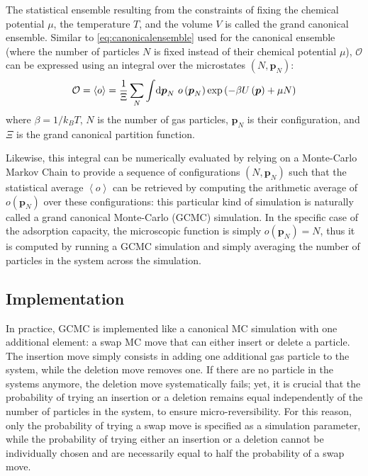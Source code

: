 \documentclass[main.tex]{subfiles}
\begin{document}
The statistical ensemble resulting from the constraints of fixing the chemical potential $\mu$, the temperature $T$, and the volume $V$ is called the grand canonical ensemble. Similar to \cref{eq:canonicalensemble} used for the canonical ensemble (where the number of particles $N$ is fixed instead of their chemical potential $\mu$), $\mathcal O$ can be expressed using an integral over the microstates $(N,\boldsymbol p_N)$:
\[\mathcal O = \left<o\right> = \frac1\Xi\sum_N\int\!\text d{\boldsymbol p_N}\  o\left({\boldsymbol p_N}\right)\exp\left(-\beta U\left({\boldsymbol p}\right) + \mu N\right)\label{eq:grandcanonicalensemble}\]
where $\beta = 1/k_BT$, $N$ is the number of gas particles, $\boldsymbol p_N$ is their configuration, and $\Xi$ is the grand canonical partition function.

Likewise, this integral can be numerically evaluated by relying on a Monte-Carlo Markov Chain to provide a sequence of configurations $(N, \boldsymbol p_N)$ such that the statistical average $\left<o\right>$ can be retrieved by computing the arithmetic average of $o\left({\boldsymbol p_N}\right)$ over these configurations: this particular kind of simulation is naturally called a grand canonical Monte-Carlo (GCMC) simulation. In the specific case of the adsorption capacity, the microscopic function is simply $o\left({\boldsymbol p_N}\right) = N$, thus it is computed by running a GCMC simulation and simply averaging the number of particles in the system across the simulation.

\subsection{Implementation}

In practice, GCMC is implemented like a canonical MC simulation with one additional element: a swap MC move that can either insert or delete a particle. The insertion move simply consists in adding one additional gas particle to the system, while the deletion move removes one. If there are no particle in the systems anymore, the deletion move systematically fails; yet, it is crucial that the probability of trying an insertion or a deletion remains equal independently of the number of particles in the system, to ensure micro-reversibility. For this reason, only the probability of trying a swap move is specified as a simulation parameter, while the probability of trying either an insertion or a deletion cannot be individually chosen and are necessarily equal to half the probability of a swap move.
\end{document}
